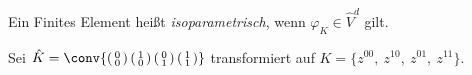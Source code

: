 \begin{Definition}
    \label{def:4.7}
    Ein Finites Element hei\ss{}t \emph{isoparametrisch}, wenn
    $\varphi_K\in \hat V^d$ gilt.
\end{Definition}


\begin{Beispiel}
    Sei $\hat K = \conv\{\left(\begin{smallmatrix}
                                    0 \\ 0
                               \end{smallmatrix}\right)
                         \left(\begin{smallmatrix}
                                    1 \\ 0
                               \end{smallmatrix}\right)
                         \left(\begin{smallmatrix}
                                    0 \\ 1
                               \end{smallmatrix}\right)
                         \left(\begin{smallmatrix}    
                                    1 \\ 1
                               \end{smallmatrix}\right)\}$
    transformiert auf $K = \{z^{00}, \ z^{10}, \ z^{01}, \ z^{11}\}$.


\end{Beispiel}

